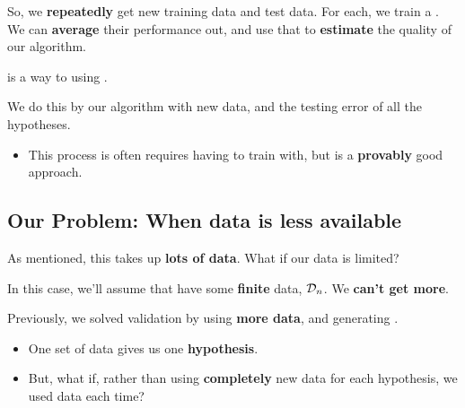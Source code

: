         So, we \textbf{repeatedly} get new training data and test data. For each, we train a . We can \textbf{average} their performance out, and use that to \textbf{estimate} the quality of our algorithm.\\
        
        \begin{definition}
             is a way to  using .
            
            We do this by  our algorithm  with new data, and  the testing error of all the hypotheses.

            \begin{itemize}
                \item This process is often requires having  to train with, but is a \textbf{provably} good approach.
            \end{itemize}
            
        \end{definition}
        
    \subsection{Our Problem: When data is less available}
        
        As mentioned, this takes up \textbf{lots of data}. What if our data is limited?

        In this case, we'll assume that have some \textbf{finite} data, ${\cal D}_n$. We \textbf{can't get more}.
        
        Previously, we solved validation by using \textbf{more data}, and generating .

        \begin{itemize}
            \item One set of data gives us one \textbf{hypothesis}.

            \item But, what if, rather than using \textbf{completely} new data for each hypothesis, we used  data each time?
        \end{itemize}
        
         
        
